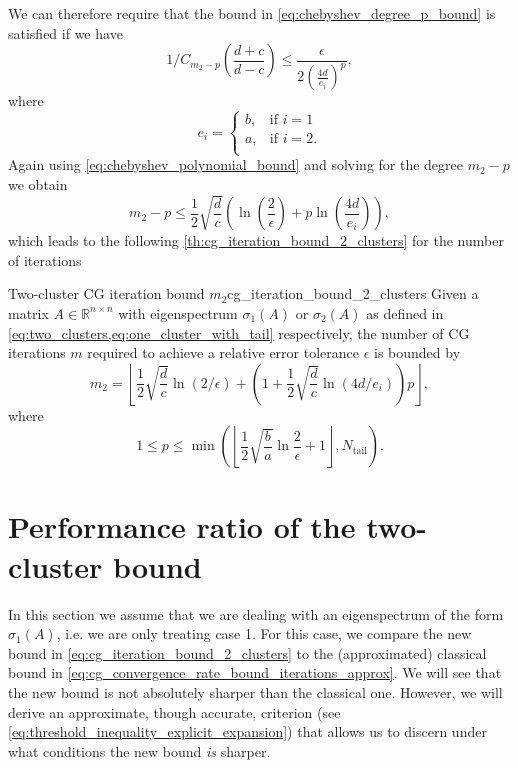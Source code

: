 We can therefore require that the bound in \cref{eq:chebyshev_degree_p_bound} is satisfied if we have
\[
    1/C_{m_2-p}\left(\frac{d+c}{d-c}\right) \leq \frac{\epsilon}{2\left( \frac{4d}{e_i}\right)^p},
\]
where
\[
    e_i = \begin{cases}
        b, &\text{if } i = 1  \\
        a, &\text{if } i = 2. \\
    \end{cases}
\]
Again using \cref{eq:chebyshev_polynomial_bound} and solving for the degree $m_2 - p$ we obtain
\[
    m_2 - p \leq \frac{1}{2}\sqrt{\frac{d}{c}}\left(\ln\left(\frac{2}{\epsilon}\right) + p \ln\left(\frac{4d}{e_i}\right)\right),
\]
which leads to the following \cref{th:cg_iteration_bound_2_clusters} for the number of iterations \cite[Equation 4.4]{cg_sharpened_convrate_Axelsson1976}
\begin{fancyth}{Two-cluster CG iteration bound $m_2$}{cg_iteration_bound_2_clusters}
    Given a matrix $A \in \mathbb{R}^{n \times n}$ with eigenspectrum $\sigma_1(A)$ or $\sigma_2(A)$ as defined in \cref{eq:two_clusters,eq:one_cluster_with_tail} respectively, the number of CG iterations $m$ required to achieve a relative error tolerance $\epsilon$ is bounded by
    \begin{equation}
        m_2=\left\lfloor\frac{1}{2} \sqrt{\frac{d}{c}} \ln (2 / \epsilon)+\left(1+\frac{1}{2} \sqrt{\frac{d}{c}} \ln (4 d / e_i)\right) p\right\rfloor,
        \label{eq:cg_iteration_bound_2_clusters}
    \end{equation}
    where
    \[
        1 \leq p \leq \min\left(\left\lfloor\frac{1}{2}\sqrt{\frac{b}{a}}\ln{\frac{2}{\epsilon}} + 1 \right\rfloor, N_{\text{tail}}\right).
    \]
\end{fancyth}

\section{Performance ratio of the two-cluster bound}\label{sec:performance_ratio}
In this section we assume that we are dealing with an eigenspectrum of the form $\sigma_1(A)$, i.e. we are only treating case 1. For this case, we compare the new bound in \cref{eq:cg_iteration_bound_2_clusters} to the (approximated) classical bound in \cref{eq:cg_convergence_rate_bound_iterations_approx}. We will see that the new bound is not absolutely sharper than the classical one. However, we will derive an approximate, though accurate, criterion (see \cref{eq:threshold_inequality_explicit_expansion}) that allows us to discern under what conditions the new bound \textit{is} sharper.

